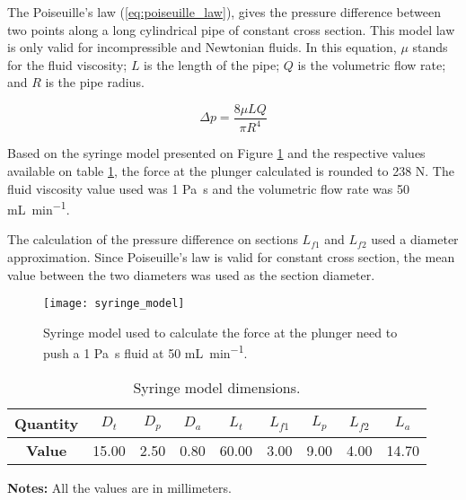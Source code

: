 The Poiseuille's law (\ref{eq:poiseuille_law}), gives the pressure difference between two points along a long cylindrical pipe of constant cross section. This model law is only valid for incompressible and Newtonian fluids. In this equation, $\mu$ stands for the fluid viscosity; $L$ is the length of the pipe; $Q$ is the volumetric flow rate; and $R$ is the pipe radius. 

\begin{equation}
    \label{eq:poiseuille_law}
    \Delta p = \frac{8 \mu L Q}{\pi R^4}
\end{equation}

Based on the syringe model presented on Figure \ref{fig:syringe_model} and the respective values available on table \ref{tab:syringe_model_dimensions}, the force at the plunger calculated is rounded to 238 \si{\newton}. The fluid viscosity value used was 1 \si{\pascal\second} and the volumetric flow rate was 50 \si{\milli\liter\per\minute}. 

The calculation of the pressure difference on sections $L_{f1}$ and $L_{f2}$ used a diameter approximation. Since Poiseuille's law is valid for constant cross section, the mean value between the two diameters was used as the section diameter. \\

\begin{figure}[htbp]
	\centering
	\texttt{[image: syringe\_model]}
	\caption{Syringe model used to calculate the force at the plunger need to push a 1 \si{\pascal\second} fluid at 50 \si{\milli\liter\per\minute}.}
	\label{fig:syringe_model}
\end{figure}

\begin{table}[htbp]
    \caption{Syringe model dimensions.}
    \centering
    \begin{threeparttable}
        \begin{tabular}{c|c|c|c|c|c|c|c|c}
        \toprule
             \textbf{Quantity} & $D_t$ & $D_p$ & $D_a$ & $L_t$ & $L_{f1}$ & $L_p$ & $L_{f2}$ & $L_a$ \\
        \midrule
             \textbf{Value} & 15.00 & 2.50 & 0.80 & 60.00 & 3.00 & 9.00 & 4.00 & 14.70 \\
        \bottomrule
        \end{tabular}
        \begin{tablenotes}
            \small
            \item \textbf{Notes:} All the values are in millimeters.
        \end{tablenotes}
    \end{threeparttable}
    \label{tab:syringe_model_dimensions}
\end{table}


